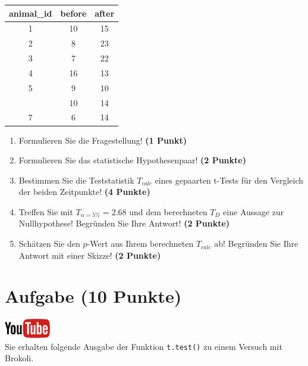 \documentclass[a4paper, 9pt]{scrartcl}\usepackage[]{graphicx}\usepackage[]{xcolor}
\begin{document}
\begin{table}[!h]
\centering
\begin{tabular}{ccc}
\toprule
animal\_id & before & after\\
\midrule
1 & 10 & 15\\
2 & 8 & 23\\
3 & 7 & 22\\
4 & 16 & 13\\
5 & 9 & 10\\
\addlinespace
6 & 10 & 14\\
7 & 6 & 14\\
\bottomrule
\end{tabular}
\end{table}



\begin{enumerate}
\item Formulieren Sie die Fragestellung! \textbf{(1 Punkt)}
\item Formulieren Sie das statistische Hypothesenpaar! \textbf{(2
    Punkte)}
\item Bestimmen Sie die Teststatistik $T_{calc}$ eines gepaarten t-Tests f{\"u}r den
  Vergleich der beiden Zeitpunkte! \textbf{(4 Punkte)}
\item Treffen Sie mit $T_{\alpha = 5\%} = 2.68$ und dem berechneten $T_{D}$ eine Aussage
  zur Nullhypothese! Begr{\"u}nden Sie Ihre Antwort! \textbf{(2 Punkte)}
\item Sch{\"a}tzen Sie den $p$-Wert aus Ihrem berechneten $T_{calc}$ ab!
  Begr{\"u}nden Sie Ihre Antwort mit einer Skizze! \textbf{(2
    Punkte)}
\end{enumerate} 
\clearpage

\section{Aufgabe \hfill (10 Punkte)}

\hfill\href{https://youtu.be/exDo7AyHl4Q}{\includegraphics[width =
  2cm]{img/youtube}}\\[1Ex]



Sie erhalten folgende \Rlogo Ausgabe der Funktion \texttt{t.test()} zu einem Versuch mit Brokoli.
\end{document}
